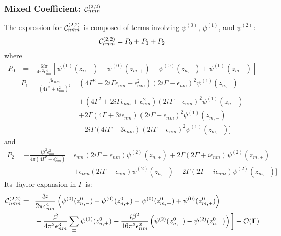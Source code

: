 \documentclass[twocolumn, prx, reprint, amsfonts, amsmath, amssymb, longbibliography, floatfix, aps]{revtex4-2}
\begin{document}
\subsubsection{Mixed Coefficient: \texorpdfstring{${\cal C}_{nmn}^{(2, 2)}$}{Cnmn}}
The expression for ${\cal C}_{nmn}^{(2, 2)}$ is composed of terms involving $\psi^{(0)}$, $\psi^{(1)}$, and $\psi^{(2)}$:
\begin{align}
{\cal C}_{nmn}^{(2, 2)} = P_0 + P_1 + P_2
\end{align}
where
\begin{align}
P_0 &= -\frac{6 i \pi}{4 \pi^2 \epsilon_{nm}^4} \left[ \psi^{(0)}(z_{n,+}) - \psi^{(0)}(z_{m,+}) - \psi^{(0)}(z_{n,-}) + \psi^{(0)}(z_{m,-}) \right]
\end{align}
\begin{align}
P_1 = \frac{\beta \epsilon_{nm}}{(4 \Gamma^2 + \epsilon_{nm}^2)^2} \Bigg[
& (4 \Gamma^2 - 2 i \Gamma \epsilon_{nm} + \epsilon_{nm}^2) (2 i \Gamma - \epsilon_{nm})^2 \psi^{(1)}(z_{n,-}) \nonumber \\
& + (4 \Gamma^2 + 2 i \Gamma \epsilon_{nm} + \epsilon_{nm}^2) (2 i \Gamma + \epsilon_{nm})^2 \psi^{(1)}(z_{n,+}) \nonumber \\
& + 2 \Gamma (4 \Gamma + 3 i \epsilon_{nm}) (2 i \Gamma + \epsilon_{nm})^2 \psi^{(1)}(z_{m,-}) \nonumber \\
& - 2 i \Gamma (4 i \Gamma + 3 \epsilon_{nm}) (2 i \Gamma - \epsilon_{nm})^2 \psi^{(1)}(z_{m,+})
\Bigg]
\end{align}
and
\begin{align}
P_2 = - \frac{i \beta^2 \epsilon_{nm}^2}{4 \pi (4 \Gamma^2 + \epsilon_{nm}^2)} \Bigg[
& \epsilon_{nm} (2 i \Gamma + \epsilon_{nm}) \psi^{(2)}(z_{n,+})
+ 2 \Gamma (2 \Gamma + i \epsilon_{nm}) \psi^{(2)}(z_{m,+}) \nonumber \\
& + \epsilon_{nm} (2 i \Gamma - \epsilon_{nm}) \psi^{(2)}(z_{n,-})
- 2 \Gamma (2 \Gamma - i \epsilon_{nm}) \psi^{(2)}(z_{m,-})
\Bigg]
\end{align}
Its Taylor expansion in $\Gamma$ is:
\begin{align}
{\cal C}_{nmn}^{(2, 2)} = \bigg[ & \frac{3i}{2\pi\epsilon_{nm}^4} \left( \psi^{(0)}(z_{n,-}^0) - \psi^{(0)}(z_{n,+}^0) - \psi^{(0)}(z_{m,-}^0) + \psi^{(0)}(z_{m,+}^0) \right) \nonumber \\
& + \frac{\beta}{4\pi^2\epsilon_{nm}^3} \sum_{\pm} \psi^{(1)}(z_{n,\pm}^0) - \frac{i\beta^2}{16\pi^3\epsilon_{nm}^2} \left( \psi^{(2)}(z_{n,+}^0) - \psi^{(2)}(z_{n,-}^0) \right) \bigg] + {\cal O}(\Gamma)
\end{align}
\end{document}
